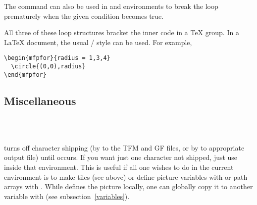\documentclass[letterpaper]{article}
\begin{document}
The command  can also be used in  and
 environments to break the loop prematurely when the given
condition becomes true.

All three of these loop structures bracket the inner code in a \TeX{}
group. In a \LaTeX{} document, the usual \slash{} style can
be used. For example,
\begin{verbatim}
\begin{mfpfor}{radius = 1,3,4}
  \circle{(0,0),radius}
\end{mfpfor}
\end{verbatim}

\subsection{Miscellaneous}\label{misc}

\begin{cd}
\\%
\\%
%
%
%
\end{cd}

 turns off character shipping (by \MF{} to the TFM and
GF files, or by \MP{} to appropriate \EPS{} output file) until
 occurs. If you want just one character not shipped,
just use  inside that  environment. This is useful
if all one wishes to do in the current  environment is to
make tiles (see above) or define picture variables with  or
path arrays with . While  defines the picture
locally, one can globally copy it to another variable with
 (see subsection~\ref{variables}).

\begin{cd}
\\
\\
\\
%
%
%
%
%
\end{cd}
\end{document}
